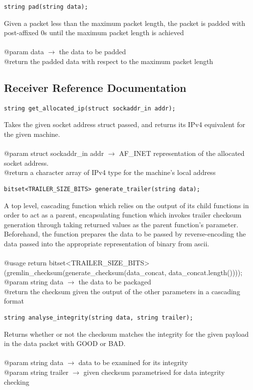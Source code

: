 \documentclass[12pt]{article}
\begin{document}
\begin{lstlisting}
string pad(string data);
\end{lstlisting}
Given a packet less than the maximum packet length, the packet is padded with post-affixed 0s until the maximum packet length is achieved\\\\
@param data $\rightarrow$ the data to be padded\\
@return the padded data with respect to the maximum packet length
\clearpage

\subsection{Receiver Reference Documentation}
\begin{lstlisting}
string get_allocated_ip(struct sockaddr_in addr);
\end{lstlisting}
Takes the given socket address struct passed, and returns its IPv4 equivalent for the given machine.\\\\
@param struct sockaddr\_in addr $\rightarrow$ AF\_INET representation of the allocated socket address.\\
@return a character array of IPv4 type for the machine's local address

\begin{lstlisting}
bitset<TRAILER_SIZE_BITS> generate_trailer(string data);
\end{lstlisting}
A top level, cascading function which relies on the output of its child functions in order to act as a parent, encapsulating function which invokes trailer checksum generation through taking returned values as the parent function's parameter. Beforehand, the function prepares the data to be passed by reverse-encoding the data passed into the appropriate representation of binary from ascii.\\\\
@usage return bitset<TRAILER\_SIZE\_BITS>(gremlin\_checksum(generate\_checksum(data\_concat, data\_concat.length())));\\
@param string data $\rightarrow$ the data to be packaged\\
@return the checksum given the output of the other parameters in a cascading format

\begin{lstlisting}
string analyse_integrity(string data, string trailer);
\end{lstlisting}
Returns whether or not the checksum matches the integrity for the given payload in the data packet with GOOD or BAD.\\\\
@param string data $\rightarrow$ data to be examined for its integrity\\
@param string trailer $\rightarrow$ given checksum parametrised for data integrity checking
\end{document}
